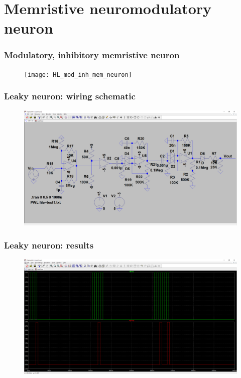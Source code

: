 \documentclass[12pt, aspectratio=169]{beamer}
\begin{document}
\section{Memristive neuromodulatory neuron}

\begin{frame}
  \frametitle{Modulatory, inhibitory memristive neuron}
  \begin{figure}
    \texttt{[image: HL\_mod\_inh\_mem\_neuron]}
  \end{figure}
\end{frame}


\begin{frame}
\frametitle{Leaky neuron: wiring schematic}
\begin{figure}
\includegraphics[width=0.85\linewidth]{Leak_sch}
\end{figure}
\end{frame}


\begin{frame}
\frametitle{Leaky neuron: results}
\begin{figure}
\includegraphics[width=0.85\linewidth]{Leak_test}
\end{figure}
\end{frame}
\end{document}
